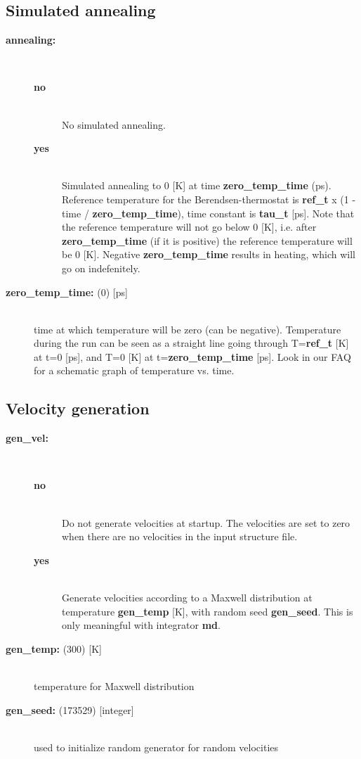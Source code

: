 \subsection{ Simulated annealing}
\begin{description}
\item[{\bf annealing:}]\mbox{}\\
\vspace{-2ex}\begin{description}
\item[{\bf no}]\mbox{}\\
No simulated annealing. 
\item[{\bf yes}]\mbox{}\\
Simulated annealing to 0 [K] at time {\bf zero\_temp\_time} (ps).
Reference temperature for the Berendsen-thermostat is
{\bf ref\_t} x (1 - time / {\bf zero\_temp\_time}),
time constant is {\bf tau\_t} [ps]. Note that the reference temperature
will not go below 0 [K], i.e. after {\bf zero\_temp\_time} (if it is positive) 
the reference temperature will be 0 [K]. Negative {\bf zero\_temp\_time} 
results in heating, which will go on indefenitely.
\end{description}
\item[{\bf zero\_temp\_time: }(0) {[ps]}]\mbox{}\\
time at which temperature will be zero (can be negative). Temperature
during the run can be seen as a straight line going through 
T={\bf ref\_t} [K] at t=0 [ps], and 
T=0 [K] at t={\bf zero\_temp\_time} [ps]. Look in our 
FAQ for a schematic 
graph of temperature vs. time.
\end{description}

\subsection{ Velocity generation}
\begin{description}
\item[{\bf gen\_vel:}]\mbox{}\\
\vspace{-2ex}\begin{description}
\item[{\bf no}]\mbox{}\\
 Do not generate velocities at startup. The velocities are set to zero
when there are no velocities in the input structure file.
\item[{\bf yes}]\mbox{}\\
Generate velocities according to a Maxwell distribution at
temperature {\bf gen\_temp} [K], with random seed {\bf gen\_seed}. 
This is only meaningful with integrator {\bf md}.
\end{description}
\item[{\bf gen\_temp: }(300) {[K]}]\mbox{}\\
temperature for Maxwell distribution
\item[{\bf gen\_seed: }(173529) {[integer]}]\mbox{}\\
used to initialize random generator for random velocities
\end{description}

